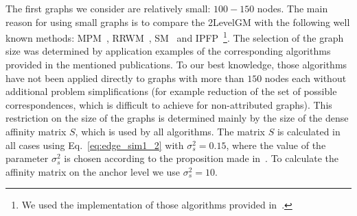 The first graphs we consider are relatively small: $100-150$ nodes. The main reason for using small graphs is to compare the 2LevelGM with the following well known methods: MPM~\cite{Cho2014_Haystack}, RRWM~\cite{Cho2010_RRWM}, SM~\cite{Leordeanu2005_SM} and IPFP~\cite{Leordeanu2009_IPFP}\footnote{We used the implementation of those algorithms provided in~\cite{code_MPM}.}. The selection of the graph size was determined by application examples of the corresponding algorithms provided in the mentioned publications. To our best knowledge, those algorithms have not been applied directly to graphs with more than $150$ nodes each without additional problem simplifications (for example reduction of the set of possible correspondences, which is difficult to achieve for non-attributed graphs). This restriction on the size of the graphs is determined mainly by the size of the dense affinity matrix $S$, which is used by all algorithms. The matrix $S$ is calculated in all cases using Eq.~\eqref{eq:edge_sim1_2} with $\sigma_s^2=0.15$, where the value of the parameter $\sigma_s^2$ is chosen according to the proposition made in~\cite{Cho2010_RRWM}. To calculate the affinity matrix on the anchor level we use $\sigma_s^2=10$. 

